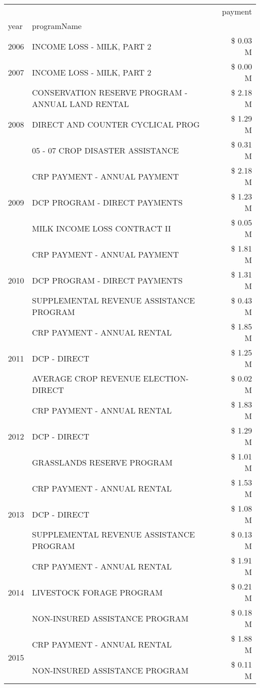 \begin{tabular}{llr}
\toprule
 &  & payment \\
year & programName &  \\
\midrule
2006 & INCOME LOSS - MILK, PART 2 & \$ 0.03 M \\
\cline{1-3}
2007 & INCOME LOSS - MILK, PART 2 & \$ 0.00 M \\
\cline{1-3}
\multirow[t]{3}{*}{2008} & CONSERVATION RESERVE PROGRAM - ANNUAL LAND RENTAL & \$ 2.18 M \\
 & DIRECT AND COUNTER CYCLICAL PROG & \$ 1.29 M \\
 & 05 - 07 CROP DISASTER ASSISTANCE & \$ 0.31 M \\
\cline{1-3}
\multirow[t]{3}{*}{2009} & CRP PAYMENT - ANNUAL PAYMENT & \$ 2.18 M \\
 & DCP PROGRAM - DIRECT PAYMENTS & \$ 1.23 M \\
 & MILK INCOME LOSS CONTRACT II & \$ 0.05 M \\
\cline{1-3}
\multirow[t]{3}{*}{2010} & CRP PAYMENT - ANNUAL PAYMENT & \$ 1.81 M \\
 & DCP PROGRAM - DIRECT PAYMENTS & \$ 1.31 M \\
 & SUPPLEMENTAL REVENUE ASSISTANCE PROGRAM & \$ 0.43 M \\
\cline{1-3}
\multirow[t]{3}{*}{2011} & CRP PAYMENT - ANNUAL RENTAL & \$ 1.85 M \\
 & DCP - DIRECT & \$ 1.25 M \\
 & AVERAGE CROP REVENUE ELECTION-DIRECT & \$ 0.02 M \\
\cline{1-3}
\multirow[t]{3}{*}{2012} & CRP PAYMENT - ANNUAL RENTAL & \$ 1.83 M \\
 & DCP - DIRECT & \$ 1.29 M \\
 & GRASSLANDS RESERVE PROGRAM & \$ 1.01 M \\
\cline{1-3}
\multirow[t]{3}{*}{2013} & CRP PAYMENT - ANNUAL RENTAL & \$ 1.53 M \\
 & DCP - DIRECT & \$ 1.08 M \\
 & SUPPLEMENTAL REVENUE ASSISTANCE PROGRAM & \$ 0.13 M \\
\cline{1-3}
\multirow[t]{3}{*}{2014} & CRP PAYMENT - ANNUAL RENTAL & \$ 1.91 M \\
 & LIVESTOCK FORAGE PROGRAM & \$ 0.21 M \\
 & NON-INSURED ASSISTANCE PROGRAM & \$ 0.18 M \\
\cline{1-3}
\multirow[t]{3}{*}{2015} & CRP PAYMENT - ANNUAL RENTAL & \$ 1.88 M \\
 & NON-INSURED ASSISTANCE PROGRAM & \$ 0.11 M \\

\end{tabular}
